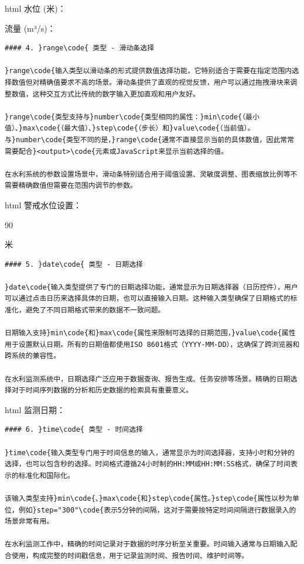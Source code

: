 html 水位 (米)：

流量 (m³/s)：

\begin{lstlisting}
#### 4. }range\code{ 类型 - 滑动条选择

}range\code{输入类型以滑动条的形式提供数值选择功能，它特别适合于需要在指定范围内选择数值但对精确值要求不高的场景。滑动条提供了直观的视觉反馈，用户可以通过拖拽滑块来调整数值，这种交互方式比传统的数字输入更加直观和用户友好。

}range\code{类型支持与}number\code{类型相同的属性：}min\code{（最小值）、}max\code{（最大值）、}step\code{（步长）和}value\code{（当前值）。与}number\code{类型不同的是，}range\code{通常不直接显示当前的具体数值，因此常常需要配合}<output>\code{元素或JavaScript来显示当前选择的值。

在水利系统的参数设置场景中，滑动条特别适合用于阈值设置、灵敏度调整、图表缩放比例等不需要精确数值但需要在范围内调节的参数。

\end{lstlisting}

html 警戒水位设置：

90

米

\begin{lstlisting}
#### 5. }date\code{ 类型 - 日期选择

}date\code{输入类型提供了专门的日期选择功能，通常显示为日期选择器（日历控件），用户可以通过点击日历来选择具体的日期，也可以直接输入日期。这种输入类型确保了日期格式的标准化，避免了不同日期格式带来的数据不一致问题。

日期输入支持}min\code{和}max\code{属性来限制可选择的日期范围，}value\code{属性用于设置默认日期。所有的日期值都使用ISO 8601格式（YYYY-MM-DD），这确保了跨浏览器和跨系统的兼容性。

在水利监测系统中，日期选择广泛应用于数据查询、报告生成、任务安排等场景。精确的日期选择对于时间序列数据的分析和历史数据的检索具有重要意义。

\end{lstlisting}

html 监测日期：

\begin{lstlisting}
#### 6. }time\code{ 类型 - 时间选择

}time\code{输入类型专门用于时间信息的输入，通常显示为时间选择器，支持小时和分钟的选择，也可以包含秒的选择。时间格式遵循24小时制的HH:MM或HH:MM:SS格式，确保了时间表示的标准化和国际化。

该输入类型支持}min\code{、}max\code{和}step\code{属性。}step\code{属性以秒为单位，例如}step="300"\code{表示5分钟的间隔，这对于需要按特定时间间隔进行数据录入的场景非常有用。

在水利监测工作中，精确的时间记录对于数据的时序分析至关重要。时间输入通常与日期输入配合使用，构成完整的时间戳信息，用于记录监测时间、报告时间、维护时间等。

\end{lstlisting}


